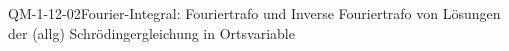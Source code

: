 
\begin{DEF}{QM-1-12-02}{Fourier-Integral: Fouriertrafo und Inverse Fouriertrafo von Lösungen der (allg) Schrödingergleichung in Ortsvariable}
\end{DEF}
